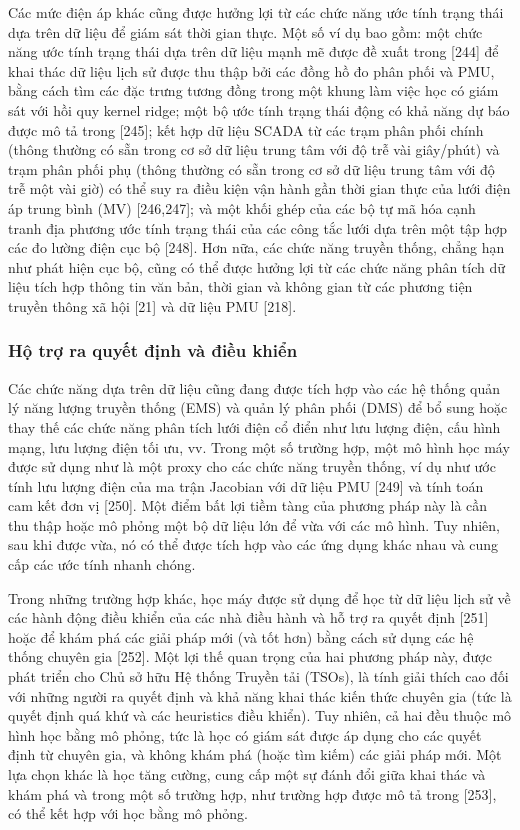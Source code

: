 \documentclass[utf8]{frontiersSCNS} %
\begin{document}
Các mức điện áp khác cũng được hưởng lợi từ các chức năng ước tính trạng thái dựa trên dữ liệu để giám sát thời gian thực. Một số ví dụ bao gồm: một chức năng ước tính trạng thái dựa trên dữ liệu mạnh mẽ được đề xuất trong [244] để khai thác dữ liệu lịch sử được thu thập bởi các đồng hồ đo phân phối và PMU, bằng cách tìm các đặc trưng tương đồng trong một khung làm việc học có giám sát với hồi quy kernel ridge; một bộ ước tính trạng thái động có khả năng dự báo được mô tả trong [245]; kết hợp dữ liệu SCADA từ các trạm phân phối chính (thông thường có sẵn trong cơ sở dữ liệu trung tâm với độ trễ vài giây/phút) và trạm phân phối phụ (thông thường có sẵn trong cơ sở dữ liệu trung tâm với độ trễ một vài giờ) có thể suy ra điều kiện vận hành gần thời gian thực của lưới điện áp trung bình (MV) [246,247]; và một khối ghép của các bộ tự mã hóa cạnh tranh địa phương ước tính trạng thái của các công tắc lưới dựa trên một tập hợp các đo lường điện cục bộ [248]. Hơn nữa, các chức năng truyền thống, chẳng hạn như phát hiện cục bộ, cũng có thể được hưởng lợi từ các chức năng phân tích dữ liệu tích hợp thông tin văn bản, thời gian và không gian từ các phương tiện truyền thông xã hội [21] và dữ liệu PMU [218].





\subsubsection{Hộ trợ ra quyết định và điều khiển}
Các chức năng dựa trên dữ liệu cũng đang được tích hợp vào các hệ thống quản lý năng lượng truyền thống (EMS) và quản lý phân phối (DMS) để bổ sung hoặc thay thế các chức năng phân tích lưới điện cổ điển như lưu lượng điện, cấu hình mạng, lưu lượng điện tối ưu, vv. Trong một số trường hợp, một mô hình học máy được sử dụng như là một proxy cho các chức năng truyền thống, ví dụ như ước tính lưu lượng điện của ma trận Jacobian với dữ liệu PMU [249] và tính toán cam kết đơn vị [250]. Một điểm bất lợi tiềm tàng của phương pháp này là cần thu thập hoặc mô phỏng một bộ dữ liệu lớn để vừa với các mô hình. Tuy nhiên, sau khi được vừa, nó có thể được tích hợp vào các ứng dụng khác nhau và cung cấp các ước tính nhanh chóng.


Trong những trường hợp khác, học máy được sử dụng để học từ dữ liệu lịch sử về các hành động điều khiển của các nhà điều hành và hỗ trợ ra quyết định [251] hoặc để khám phá các giải pháp mới (và tốt hơn) bằng cách sử dụng các hệ thống chuyên gia [252]. Một lợi thế quan trọng của hai phương pháp này, được phát triển cho Chủ sở hữu Hệ thống Truyền tải (TSOs), là tính giải thích cao đối với những người ra quyết định và khả năng khai thác kiến thức chuyên gia (tức là quyết định quá khứ và các heuristics điều khiển). Tuy nhiên, cả hai đều thuộc mô hình học bằng mô phỏng, tức là học có giám sát được áp dụng cho các quyết định từ chuyên gia, và không khám phá (hoặc tìm kiếm) các giải pháp mới. Một lựa chọn khác là học tăng cường, cung cấp một sự đánh đổi giữa khai thác và khám phá và trong một số trường hợp, như trường hợp được mô tả trong [253], có thể kết hợp với học bằng mô phỏng.
\end{document}
